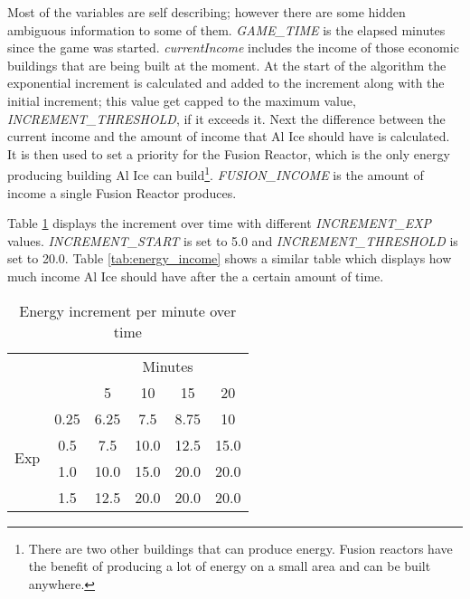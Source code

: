 Most of the variables are self describing; however there are some hidden ambiguous information to
some of them. \emph{GAME\_TIME} is the elapsed minutes since the game was started.
\emph{currentIncome} includes the income of those economic buildings that are being built at the
moment. At the start of the algorithm the exponential increment is calculated and added to the
increment along with the initial increment; this value get capped to the maximum value,
\emph{INCREMENT\_THRESHOLD}, if it exceeds it. Next the difference between the current income and
the amount of income that Al Ice should have is calculated. It is then used to set a priority for the Fusion Reactor, which is the only energy producing building Al
Ice can build\footnote{There are two other buildings that can produce energy. Fusion reactors have
the benefit of producing a lot of energy on a small area and can be built anywhere.}.
\emph{FUSION\_INCOME} is the amount of income a single Fusion Reactor produces.

Table \ref{tab:energy_increment} displays the increment over time with different
\emph{INCREMENT\_EXP} values. \emph{INCREMENT\_START} is set to 5.0 and \emph{INCREMENT\_THRESHOLD}
is set to 20.0. Table \ref{tab:energy_income} shows a similar table which displays how much income
Al Ice should have after the a certain amount of time.

\begin{table}[htb]
\caption{Energy increment per minute over time}\label{tab:energy_increment}
\begin{center}
\begin{tabular}{ccc|c|c|c|}
\toprule
& & \multicolumn{4}{c}{Minutes} \\ \cline{3-6}
& & \multicolumn{1}{|c|}{5} & 10 & 15 & 20 \\ \cline{2-6}
\multirow{4}{*}{Exp} &
\multicolumn{1}{|c|}{0.25} & 6.25 & 7.5 & 8.75 & 10 \\ \cline{2-6}
& \multicolumn{1}{|c|}{0.5} & 7.5 & 10.0 & 12.5 & 15.0 \\ \cline{2-6}
& \multicolumn{1}{|c|}{1.0} & 10.0 & 15.0 & 20.0 & 20.0 \\ \cline{2-6}
& \multicolumn{1}{|c|}{1.5} & 12.5 & 20.0 & 20.0 & 20.0 \\ \cline{2-6}
\bottomrule
\end{tabular}
\end{center}
\end{table}

